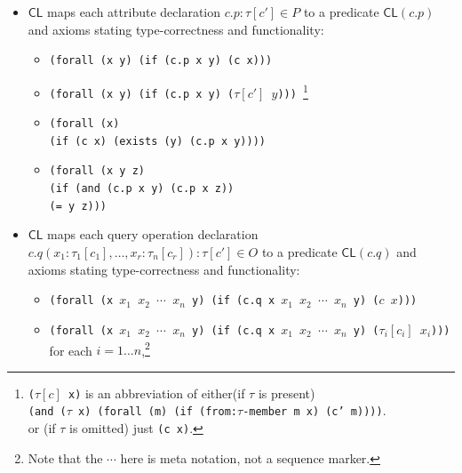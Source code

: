 \documentclass[10pt,fleqn,final]{scrreprt}
\newcommand{\cbs}[0]{\color{red}\xspace} %
\newcommand{\cbe}[0]{\color{black}\xspace} %
\newcommand*{\CL}{\ensuremath{\mathsf{CL}}\xspace}
\newenvironment{definitions}[0]{\medskip }{}
\newcommand{\white}[1]{{\color{white}{#1}}}
\newcommand{\qqquad}{\white{x}\qquad}
\begin{document}
\begin{definitions}
\begin{itemize}
  \item $\CL$ maps each attribute declaration $c.p : \tau[c'] \in P$ to a predicate $\CL(c.p)$ and axioms stating type-correctness
and functionality:
\begin{itemize}
\item
\texttt{(forall (x y) (if (c.p x y) (c x))) }
\item 
\texttt{(forall (x y) (if (c.p x y) ($\tau[c']$ $y$))) }\footnote
{\cbs \texttt{($\tau[c]$ x)} is an abbreviation of either\cbe (if $\tau$ is present)\\
\texttt{(and ($\tau$ x) (forall (m) (if (from:$\tau$-member m x) (c' m))))}.\\
or (if $\tau$ is omitted) just \texttt{(c x)}.}
\item 
\texttt{(forall (x)\\
\qqquad  (if (c x) (exists (y) (c.p x y))))}
\item 
\texttt{(forall (x y z)}\\
\qqquad \texttt{(if (and (c.p x y) (c.p x z))}\\
\qqquad\qqquad\texttt{(= y z)))}
\end{itemize}
  \item $\CL$ maps each query operation declaration $c.q(x_1 :
    \tau_1[c_1], \dots, x_r : \tau_n[c_r]) : \tau[c'] \in O$ to a
    predicate $\CL(c.q)$ and axioms stating type-correctness and
    functionality:
\begin{itemize}
\item
\texttt{(forall (x $x_1$ $x_2$ $\cdots$  $x_n$ y) (if (c.q x $x_1$ $x_2$ $\cdots$  $x_n$ y) ($c$ $x$))) }
\item 
\texttt{(forall (x $x_1$ $x_2$ $\cdots$  $x_n$ y) (if (c.q x $x_1$ $x_2$ $\cdots$  $x_n$ y) ($\tau_i[c_i]$ $x_i$))) }
for each $i=1\ldots n$,\footnote{Note that the $\cdots$ here is meta notation, not a sequence marker.}

\end{itemize}
\end{itemize}
\end{definitions}
\end{document}

